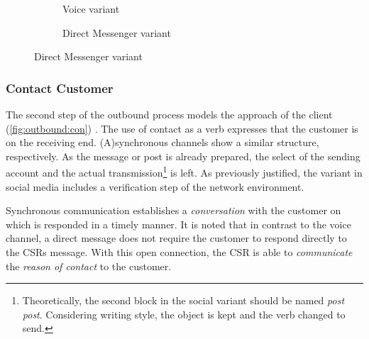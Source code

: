 \begin{figure}[caption={Prepare contact detail process}, label={fig:outbound:prep}]
\begin{subfigure}[b]{.45\textwidth}
\begin{tikzpicture}
	 		\end{tikzpicture}
	 		\caption{Voice variant}\label{fig:outbound:prep:voice}
	 	\end{subfigure}
	 	\begin{subfigure}[b]{.45\textwidth}
	 		\centering	
	 		\caption{Direct Messenger variant}\label{fig:outbound:prep:dm}
	 	\end{subfigure}
	 \end{figure}
	 
	 
	 \subsubsection{Contact Customer}
	 
	 The second step of the outbound process models the approach of the client (\Fig \ref{fig:outbound:con}) . The use of contact as a verb expresses that the customer is on the receiving end. (A)synchronous channels show a similar structure, respectively. As the message or post is already prepared, the select of the sending account and the actual transmission\footnote{Theoretically, the second block in the social variant should be named \textit{post post}. Considering writing style, the object is kept and the verb changed to send. } is left. As previously justified, the variant in social media includes a verification step of the network environment. 
	 
	 Synchronous communication establishes a \textit{conversation} with the customer on which is responded in a timely manner. It is noted that in contrast to the voice channel, a direct message does not require the customer to respond directly to the \acrshort{CSR}s message. With this open connection, the  \acrshort{CSR} is able to \textit{communicate} the \textit{reason of contact} to the customer. 
	 
